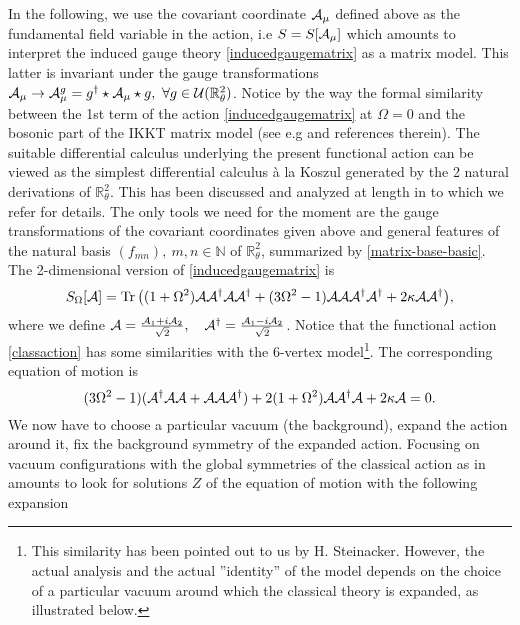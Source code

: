 \documentclass[a4paper,11pt,twoside]{article}
\numberwithin{equation}{section}
\DeclareMathOperator{\tr}{Tr}
\theoremstyle{nonumberplain}
\newcounter{and}
\begin{document}
In the following, we use the covariant coordinate ${\cal{A}}_\mu$  defined above as the fundamental field variable in the action, i.e $S=S[{\cal{A}}_\mu]$ which amounts to interpret the induced gauge theory \eqref{inducedgaugematrix} as a matrix model. This latter is invariant under the gauge transformations ${\cal{A}}_\mu\rightarrow{\cal{A}}_\mu^g=g^\dag\star{\cal{A}}_\mu\star g,\ \forall g\in{\cal{U}}(\mathbb{R}^2_\theta)$. Notice by the way the formal similarity between the 1st term of the action \eqref{inducedgaugematrix} at $\Omega=0$ and the bosonic part of the IKKT matrix model (see e.g \cite{blasch-stein-10} and references therein). The suitable differential calculus underlying the present functional action can be viewed as the simplest differential calculus \`a la Koszul generated by the 2 natural derivations of $\mathbb{R}^2_\theta$. This has been discussed and analyzed at length in \cite{WAL1,WAL2} to which we refer for details. The only tools we need for the moment are the gauge transformations 
of the covariant coordinates given above and general features of the natural basis $(f_{mn}),\ m,n\in\mathbb{N}$ of $\mathbb{R}^2_\theta$, summarized by \eqref{matrix-base-basic}. The 2-dimensional version of \eqref{inducedgaugematrix} is
\begin{equation}
S_\Omega[\mathcal{A}]=\tr\big((1+\Omega^2){\cal{A}}{\cal{A}^\dag}{\cal{A}}{\cal{A}}^\dag+(3\Omega^2-1){\cal{A}}{\cal{A}}{\cal{A}}^\dag{\cal{A}}^\dag+
2\kappa{\cal{A}}
{\cal{A}}^\dag\big)\label{classaction},
\end{equation}
where we define ${\cal{A}}={{{\cal{A}}_1+i{\cal{A}}_2}\over{\sqrt{2}}},\quad {{\cal{A}}}^\dag={{{\cal{A}}_1-i{\cal{A}}_2}\over{\sqrt{2}}}$.
Notice that the functional action \eqref{classaction} has some similarities with the 6-vertex model\footnote{This similarity has been pointed out to us by H. Steinacker. However, the actual analysis and the actual ''identity'' of the model depends on the choice of a particular vacuum around which the classical theory is expanded, as illustrated below.}. The corresponding equation of motion is 
\begin{equation}
(3\Omega^2-1)({\cal{A}}^\dag{\cal{A}}{\cal{A}}+{\cal{A}}{\cal{A}}{\cal{A}}^\dag)+2(1+\Omega^2){\cal{A}}{\cal{A}}^\dag{\cal{A}}+2\kappa{\cal{A}}=0\label{eqmotion}.
\end{equation}
We now have to choose a particular vacuum (the background), expand the action around it, fix the background symmetry of the expanded action. Focusing on vacuum configurations with the global symmetries of the classical action as in \cite{GWW2} amounts to look for solutions $Z$ of the equation of motion with the following expansion
\end{document}
